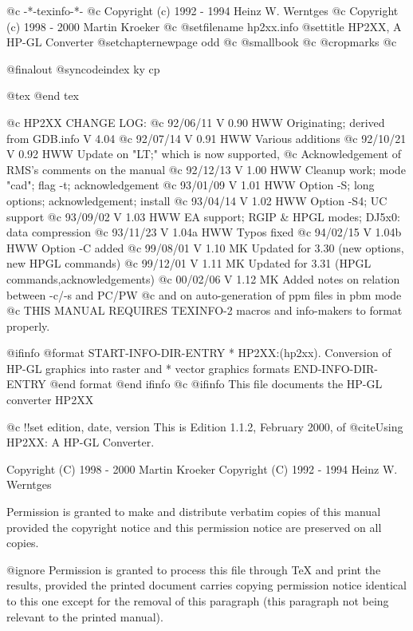       @c -*-texinfo-*-
@c Copyright (c) 1992 - 1994  Heinz W. Werntges
@c Copyright (c) 1998 - 2000  Martin Kroeker
@c %
@setfilename hp2xx.info
@settitle HP2XX, A HP-GL Converter
@setchapternewpage odd
@c @smallbook
@c @cropmarks
@c %

@finalout
@syncodeindex ky cp

@tex
\xdef\manvers{$Revision: 1.1.2 $}  %
@end tex

@c HP2XX CHANGE LOG:
@c 92/06/11  V 0.90  HWW  Originating; derived from GDB.info V 4.04
@c 92/07/14  V 0.91  HWW  Various additions
@c 92/10/21  V 0.92  HWW  Update on "LT;" which is now supported,
@c                        Acknowledgement of RMS's comments on the manual
@c 92/12/13  V 1.00  HWW  Cleanup work; mode "cad"; flag -t; acknowledgement
@c 93/01/09  V 1.01  HWW  Option -S; long options; acknowledgement; install
@c 93/04/14  V 1.02  HWW  Option -S4; UC support
@c 93/09/02  V 1.03  HWW  EA support; RGIP & HPGL modes; DJ5x0: data compression
@c 93/11/23  V 1.04a HWW  Typos fixed
@c 94/02/15  V 1.04b HWW  Option -C added
@c 99/08/01  V 1.10  MK   Updated for 3.30 (new options, new HPGL commands)
@c 99/12/01  V 1.11  MK   Updated for 3.31 (HPGL commands,acknowledgements)
@c 00/02/06  V 1.12  MK   Added notes on relation between -c/-s and PC/PW
@c                        and on auto-generation of ppm files in pbm mode
@c THIS MANUAL REQUIRES TEXINFO-2 macros and info-makers to format properly.

@ifinfo
@format
START-INFO-DIR-ENTRY
* HP2XX:(hp2xx).  Conversion of HP-GL graphics into raster and
*                 vector graphics formats
END-INFO-DIR-ENTRY
@end format
@end ifinfo
@c
@ifinfo
This file documents the HP-GL converter HP2XX

@c !!set edition, date, version
This is Edition 1.1.2, February 2000,
of @cite{Using HP2XX: A HP-GL Converter}.

Copyright (C) 1998 - 2000 Martin Kroeker
Copyright (C) 1992 - 1994 Heinz W. Werntges

Permission is granted to make and distribute verbatim copies of
this manual provided the copyright notice and this permission notice
are preserved on all copies.

@ignore
Permission is granted to process this file through TeX and print the
results, provided the printed document carries copying permission
notice identical to this one except for the removal of this paragraph
(this paragraph not being relevant to the printed manual).

